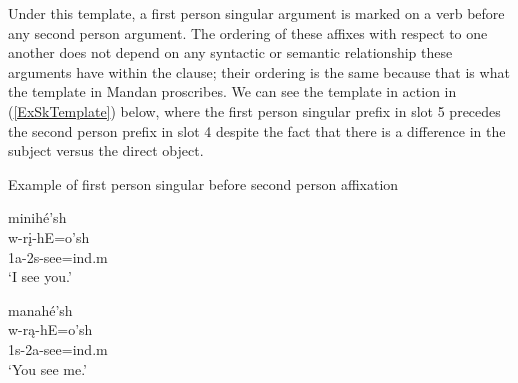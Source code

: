 \begin{table}
\caption{Verbal prefix field in Mandan}\label{prefixfieldmandanSketch}

\end{table}

Under this template, a first person singular argument is marked on a verb before any second person argument. The ordering of these affixes with respect to one another does not depend on any syntactic or semantic relationship these arguments have within the clause; their ordering is the same because that is what the template in Mandan proscribes. We can see the template in action in (\ref{ExSkTemplate}) below, where the first person singular prefix in slot 5 precedes the second person prefix in slot 4 despite the fact that there is a difference in the subject versus the direct object.

\begin{exe}
    \item\label{ExSkTemplate} Example of first person singular before second person affixation

    \begin{xlist}
        \item\label{ExSkTemplateA} \glll minihé'sh\\
        w-rį-hE=o'sh\\
        1a-2s-\textnormal{see}=ind.m\\
        \glt `I see you.'
        \item\label{ExSkTemplateB} \glll manahé'sh\\
        w-rą-hE=o'sh\\
        1s-2a-\textnormal{see}=ind.m\\
        \glt `You see me.'    \end{xlist}
\end{exe}

